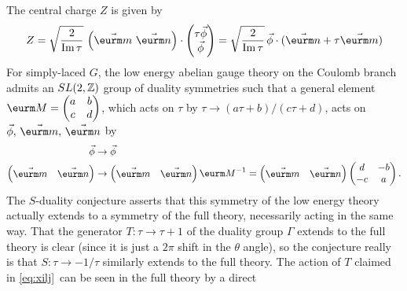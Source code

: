The central charge $Z$ is given by %
\setcounter{equation}{21}
\begin{equation}\label{eq:pikf}
Z=\sqrt{2\over {\rm
Im}\,\tau}\,\left(\vec{\eurm m}~\vec{\eurm n}\right)\cdot
\left(\begin{matrix}\tau\vec \phi \\\vec \phi \\\end{matrix}\right)=\sqrt {2\over
{\rm Im}\,\tau}\,\vec \phi\cdot (\vec{\eurm n}+\tau \vec{\eurm m})
\end{equation}
  For simply-laced $G$, the low energy abelian gauge theory on
 the Coulomb branch admits an $SL(2,\Bbb{Z})$ group of duality
 symmetries such that a general element
$\eurm M=\left(\begin{matrix}a&b\\ c&d\\\end{matrix}\right)$, which  acts on
$\tau$ by $\tau\to (a\tau+b)/(c\tau+d)$, acts on $\vec{\phi},\,
\vec{{\eurm m}},\, \vec{{\eurm n}} $ by
\setcounter{equation}{22}
\begin{equation}\label{eq:xilj}
\begin{aligned}\vec{\phi} & \to
\vec{\phi}\\\left(\begin{matrix}\vec{{\eurm m}} & \vec{{\eurm
n}}\end{matrix}\right)&\to \left(\begin{matrix}\vec{{\eurm m}} & \vec{{\eurm
n}}\end{matrix}\right){\eurm M}^{-1}=\left(\begin{matrix} \vec{{\eurm m}} &
\vec{{\eurm n}}\end{matrix}\right)\left(\begin{matrix}d & -b  \\ -c & a
\\\end{matrix}\right).\end{aligned}
\end{equation}
 The $S$-duality conjecture asserts that this
symmetry of the low energy theory actually extends to a symmetry
of the full theory, necessarily acting in the same way. That the
generator $T:\tau\to\tau+1$ of the duality group $\Gamma$ extends
to the full theory is clear (since it is just a $2\pi$ shift in
the $\theta$ angle), so the conjecture really is that $S:\tau\to
-1/\tau$ similarly extends to the full theory. The action of $T$
claimed in \eqref{eq:xilj}\ can be seen in the full theory by a direct
